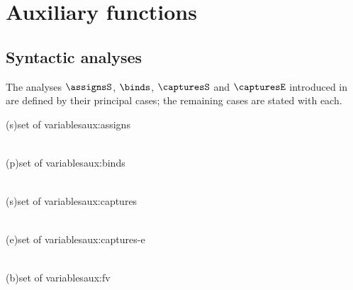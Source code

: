 \chapter{Auxiliary functions}
\label{ch:auxiliary-functions}

\section{Syntactic analyses}
\label{sec:mf-syntactic}

The analyses $\assignsS$, $\binds$, $\capturesS$ and $\capturesE$ introduced in  are
defined by their principal cases; the remaining cases are stated with each.

\begin{auxfunction}{\assignsS(s)}{set of variables}{aux:assigns}

\begin{align*}

\end{align*}
\end{auxfunction}

\begin{auxfunction}{\binds(p)}{set of variables}{aux:binds}

\begin{align*}

\end{align*}
\end{auxfunction}

\begin{auxfunction}{\capturesS(s)}{set of variables}{aux:captures}

\begin{align*}

\end{align*}
\end{auxfunction}

\begin{auxfunction}{\capturesE(e)}{set of variables}{aux:captures-e}

\begin{align*}

\end{align*}
\end{auxfunction}

\begin{auxfunction}{\fvS(b)}{set of variables}{aux:fv}

\end{auxfunction}

